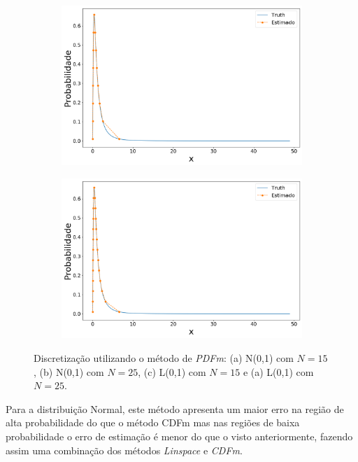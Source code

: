 \begin{figure}[H]
	\begin{subfigure}[b]{0.45\textwidth}
		\centering 
		\includegraphics[width=\linewidth]{./figuras/PDFm_lognormal_15}
		\caption{}
		\label{fig:pdflognorm15}
	\end{subfigure}
	\hfill
	\begin{subfigure}[b]{0.45\textwidth}
		\centering 
		\includegraphics[width=\linewidth]{./figuras/PDFm_lognormal_25}
		\caption{}
		\label{fig:pdflognorm25}
	\end{subfigure}
	
	\caption{Discretização utilizando o método de \textit{PDFm}: (a) N(0,1) com $N = 15$, (b) N(0,1) com $N = 25$, (c) L(0,1) com $N = 15$ e (a) L(0,1) com $N = 25$.}
	\label{fig:pdfmnorm}
\end{figure}



Para a distribuição Normal, este método apresenta um maior erro na região de alta probabilidade do que o método \ac{CDFm} mas nas regiões de baixa probabilidade o erro de estimação é menor do que o visto anteriormente, fazendo assim uma combinação dos métodos \textit{Linspace} e \textit{CDFm}.

